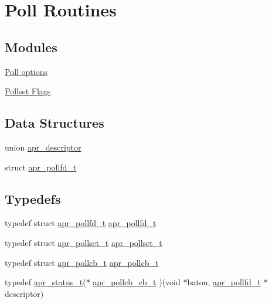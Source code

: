 \hypertarget{group__apr__poll}{\section{Poll Routines}
\label{group__apr__poll}
}
\subsection*{Modules}
\begin{DoxyCompactItemize}
\item 
\hyperlink{group__pollopts}{Poll options}
\item 
\hyperlink{group__pollflags}{Pollset Flags}
\end{DoxyCompactItemize}
\subsection*{Data Structures}
\begin{DoxyCompactItemize}
\item 
union \hyperlink{unionapr__descriptor}{apr\-\_\-descriptor}
\item 
struct \hyperlink{structapr__pollfd__t}{apr\-\_\-pollfd\-\_\-t}
\end{DoxyCompactItemize}
\subsection*{Typedefs}
\begin{DoxyCompactItemize}
\item 
typedef struct \hyperlink{structapr__pollfd__t}{apr\-\_\-pollfd\-\_\-t} \hyperlink{group__apr__poll_ga0c89b184cbe2337e44207f1ad245129b}{apr\-\_\-pollfd\-\_\-t}
\item 
typedef struct \hyperlink{group__apr__poll_ga680da1f10ac5ef75efc503a9d15b8906}{apr\-\_\-pollset\-\_\-t} \hyperlink{group__apr__poll_ga680da1f10ac5ef75efc503a9d15b8906}{apr\-\_\-pollset\-\_\-t}
\item 
typedef struct \hyperlink{group__apr__poll_gae382e39bdf0c5a02fca7da3944bece08}{apr\-\_\-pollcb\-\_\-t} \hyperlink{group__apr__poll_gae382e39bdf0c5a02fca7da3944bece08}{apr\-\_\-pollcb\-\_\-t}
\item 
typedef \hyperlink{group__apr__errno_gaf76ee4543247e9fb3f3546203e590a6c}{apr\-\_\-status\-\_\-t}($\ast$ \hyperlink{group__apr__poll_gad440412b52e12fcfddfdd5b1618359e5}{apr\-\_\-pollcb\-\_\-cb\-\_\-t} )(void $\ast$baton, \hyperlink{structapr__pollfd__t}{apr\-\_\-pollfd\-\_\-t} $\ast$descriptor)
\end{DoxyCompactItemize}
